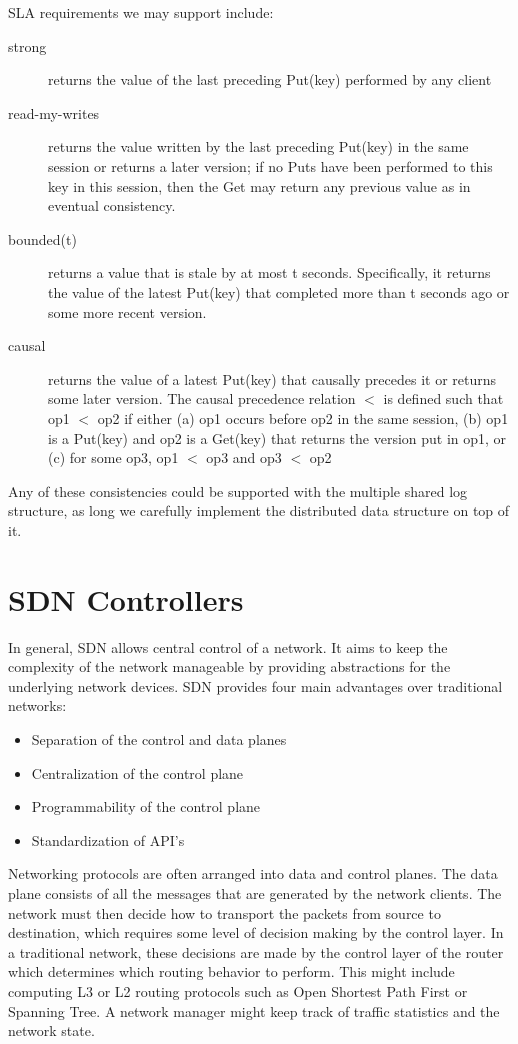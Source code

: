 \documentclass[letterpaper,twocolumn,10pt]{article}
\begin{document}
SLA requirements we may support include: \cite{SLA}

\begin{description}
\item[strong] returns the value of the last preceding Put(key) performed by any client
\item[read-my-writes] returns the value written by the last preceding Put(key) in the same session or returns a later version; if no Puts have been performed to this key in this session, then the Get may return any previous value as in eventual consistency.
\item[bounded(t)] returns a value that is stale by at most t seconds. Specifically, it returns the value of the latest Put(key) that completed more than t seconds ago or some more recent version.
\item[causal] returns the value of a latest Put(key) that causally precedes it or returns some later version. The causal precedence relation $<$ is defined such that op1 $<$ op2 if either
(a) op1 occurs before op2 in the same session,
(b) op1 is a Put(key) and op2 is a Get(key) that
returns the version put in op1, or
(c) for some op3, op1 $<$ op3 and op3 $<$ op2
\end{description}

Any of these consistencies could be supported with the multiple shared log structure, as long we carefully implement the distributed data structure on top of it.

\section{SDN Controllers}

In general, SDN allows central control of a network. It aims to keep the complexity of the network manageable by providing abstractions for the underlying network devices. SDN provides four main advantages over traditional networks:\cite{jain2013network}

\begin{itemize}
\item Separation of the control and data planes
\item Centralization of the control plane
\item Programmability of the control plane
\item Standardization of API's
\end{itemize}
\cite{SDN}

Networking protocols are often arranged into data and control planes. The data plane consists of all the messages that are generated by the network clients. The network must then decide how to transport the packets from source to destination, which requires some level of decision making by the control layer. In a traditional network, these decisions are made by the control layer of the router which determines which routing behavior to perform. This might include computing L3 or L2
routing protocols such as Open Shortest Path First or Spanning Tree. A network manager might keep track of traffic statistics and the network state.
\end{document}
